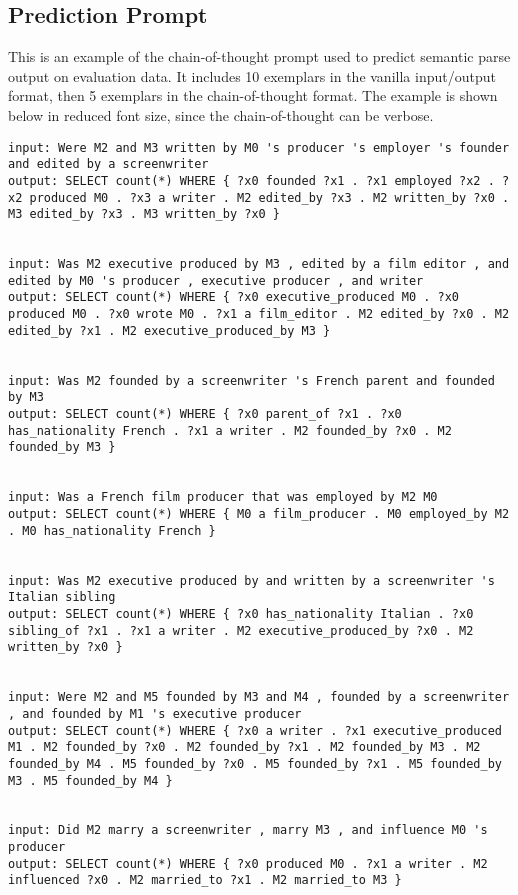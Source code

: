 \documentclass{article} \usepackage{iclr2022_conference,times}
\begin{document}
\subsection{Prediction Prompt \label{app:cfq_cot_prompt}}

This is an example of the chain-of-thought prompt used to predict semantic parse output on evaluation data. It includes 10 exemplars in the vanilla input/output format, then 5 exemplars in the chain-of-thought format. The example is shown below in reduced font size, since the chain-of-thought can be verbose.

\begin{lstlisting}
input: Were M2 and M3 written by M0 's producer 's employer 's founder and edited by a screenwriter
output: SELECT count(*) WHERE { ?x0 founded ?x1 . ?x1 employed ?x2 . ?x2 produced M0 . ?x3 a writer . M2 edited_by ?x3 . M2 written_by ?x0 . M3 edited_by ?x3 . M3 written_by ?x0 }


input: Was M2 executive produced by M3 , edited by a film editor , and edited by M0 's producer , executive producer , and writer
output: SELECT count(*) WHERE { ?x0 executive_produced M0 . ?x0 produced M0 . ?x0 wrote M0 . ?x1 a film_editor . M2 edited_by ?x0 . M2 edited_by ?x1 . M2 executive_produced_by M3 }


input: Was M2 founded by a screenwriter 's French parent and founded by M3
output: SELECT count(*) WHERE { ?x0 parent_of ?x1 . ?x0 has_nationality French . ?x1 a writer . M2 founded_by ?x0 . M2 founded_by M3 }


input: Was a French film producer that was employed by M2 M0
output: SELECT count(*) WHERE { M0 a film_producer . M0 employed_by M2 . M0 has_nationality French }


input: Was M2 executive produced by and written by a screenwriter 's Italian sibling
output: SELECT count(*) WHERE { ?x0 has_nationality Italian . ?x0 sibling_of ?x1 . ?x1 a writer . M2 executive_produced_by ?x0 . M2 written_by ?x0 }


input: Were M2 and M5 founded by M3 and M4 , founded by a screenwriter , and founded by M1 's executive producer
output: SELECT count(*) WHERE { ?x0 a writer . ?x1 executive_produced M1 . M2 founded_by ?x0 . M2 founded_by ?x1 . M2 founded_by M3 . M2 founded_by M4 . M5 founded_by ?x0 . M5 founded_by ?x1 . M5 founded_by M3 . M5 founded_by M4 }


input: Did M2 marry a screenwriter , marry M3 , and influence M0 's producer
output: SELECT count(*) WHERE { ?x0 produced M0 . ?x1 a writer . M2 influenced ?x0 . M2 married_to ?x1 . M2 married_to M3 }



\end{lstlisting}
\end{document}
